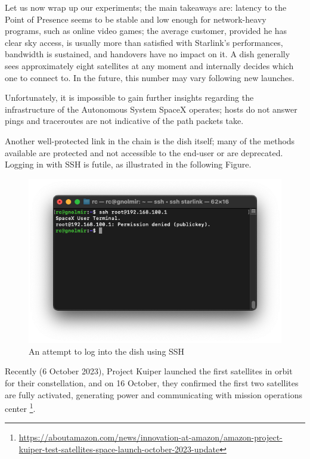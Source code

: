 \documentclass[IN,11pt,twoside,openright,idp,english]{tumthesis}
\begin{document}
Let us now wrap up our experiments; the main takeaways are: latency to the Point of Presence seems to be stable and low enough for network-heavy programs, such as online video games; the average customer, provided he has clear sky access, is usually more than satisfied with Starlink's performances, bandwidth is sustained, and handovers have no impact on it. A dish generally sees approximately eight satellites at any moment and internally decides which one to connect to. In the future, this number may vary following new launches.

Unfortunately, it is impossible to gain further insights regarding the infrastructure of the Autonomous System SpaceX operates; hosts do not answer pings and traceroutes are not indicative of the path packets take. 

Another well-protected link in the chain is the dish itself; many of the methods available are protected and not accessible to the end-user or are deprecated.
Logging in with SSH is futile, as illustrated in the following Figure.

\begin{figure}
    \centering
    \includegraphics[width=1\columnwidth]{img/ssh.png}
    \caption{An attempt to log into the dish using SSH}
    \label{fig:ssh}
\end{figure}

Recently (6 October  2023), Project Kuiper launched the first satellites in orbit for their constellation, and on 16 October, they confirmed the first two satellites are fully activated, generating power and communicating with mission operations center \footnote{\url{https://aboutamazon.com/news/innovation-at-amazon/amazon-project-kuiper-test-satellites-space-launch-october-2023-update}}.
\end{document}
